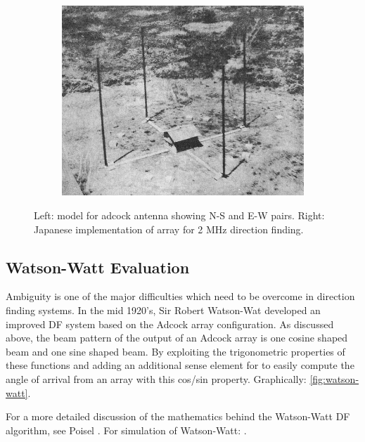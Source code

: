 \begin{figure}
\begin{subfigure}[b]{0.6\textwidth}
    \includegraphics[width=\textwidth]{./img/lit_review/adcock_implementation}
  \end{subfigure}
  \caption{Left: model for adcock antenna showing N-S and E-W pairs. Right: Japanese implementation of array for 2 MHz direction finding.}
  \label{fig:lit_adcock_array}
\end{figure}


\subsection{Watson-Watt Evaluation}
Ambiguity is one of the major difficulties which need to be overcome in direction finding systems. In the mid 1920's, Sir Robert Watson-Wat developed an improved DF system based on the Adcock array configuration. As discussed above, the beam pattern of the output of an Adcock array is one cosine shaped beam and one sine shaped beam. 
By exploiting the trigonometric properties of these functions and adding an additional sense element for to easily compute the angle of arrival from an array with this cos/sin property. Graphically: \autoref{fig:watson-watt}.

For a more detailed discussion of the mathematics behind the Watson-Watt DF algorithm, see Poisel \cite{poisel2008introduction}. For simulation of Watson-Watt: \cite{adcockwatsonwattrdf}.

